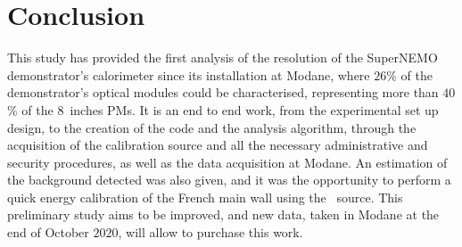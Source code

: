 \section{Conclusion}


This study has provided the first analysis of the resolution of the SuperNEMO demonstrator's calorimeter since its installation at Modane, where $26$\% of the demonstrator's optical modules could be characterised, representing more than $40$\% of the $8$~inches PMs.
It is an end to end work, from the experimental set up design, to the creation of the code and the analysis algorithm, through the acquisition of the calibration source and all the necessary administrative and security procedures, as well as the data acquisition at Modane.
An estimation of the background detected was also given, and it was the opportunity to perform a quick energy calibration of the French main wall using the \Co\ source.
This preliminary study aims to be improved, and new data, taken in Modane at the end of October $2020$, will allow to purchase this work.







